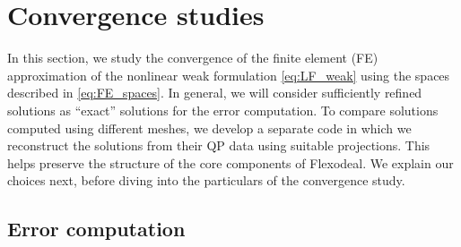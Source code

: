 \documentclass{sfuthesis}
\numberwithin{equation}{section}
\numberwithin{figure}{chapter}
\numberwithin{table}{chapter}
\theoremstyle{definition}
\begin{document}
\section{Convergence studies} \label{sec:flexodeal_convergence}

In this section, we study the convergence of the finite element (FE) approximation of the nonlinear weak formulation \eqref{eq:LF_weak} using the spaces described in \eqref{eq:FE_spaces}. In general, we will consider sufficiently refined solutions as ``exact'' solutions for the error computation. To compare solutions computed using different meshes, we develop a separate code in which we reconstruct the solutions from their QP data using suitable projections. This helps preserve the structure of the core components of Flexodeal. We explain our choices next, before diving into the particulars of the convergence study.

\subsection{Error computation}
\end{document}
